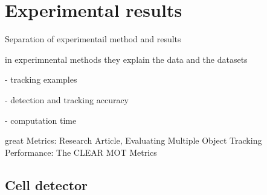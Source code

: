 \chapter{Experimental results }
\label{chap:results}
\notyetimplemented{}


Separation of experimentail method and results

in experimnental methods they explain the data and the datasets


- tracking examples

- detection and tracking accuracy

- computation time


great Metrics: Research Article, Evaluating Multiple Object Tracking Performance: The CLEAR MOT Metrics

	\section{Cell detector }
		
